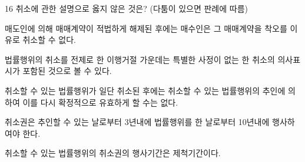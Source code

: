 \begin{question}{16}
취소에 관한 설명으로 옳지 않은 것은? (다툼이 있으면 판례에 따름)
\begin{choices}
  \item 매도인에 의해 매매계약이 적법하게 해제된 후에는 매수인은 그 매매계약을 착오를 이유로 취소할 수 없다.
  \item 법률행위의 취소를 전제로 한 이행거절 가운데는 특별한 사정이 없는 한 취소의 의사표시가 포함된 것으로 볼 수 있다.
  \item 취소할 수 있는 법률행위가 일단 취소된 후에는 취소할 수 있는 법률행위의 추인에 의하여 이를 다시 확정적으로 유효하게 할 수는 없다.
  \item 취소권은 추인할 수 있는 날로부터 3년내에 법률행위를 한 날로부터 10년내에 행사하여야 한다.
  \item 취소할 수 있는 법률행위의 취소권의 행사기간은 제척기간이다.
\end{choices}
\end{question}
